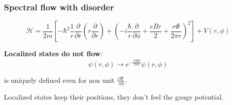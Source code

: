 \documentclass{beamer}
\begin{document}
\begin{frame}
\frametitle{Spectral flow with disorder}
\begin{center}
\[
\mathcal{H} = \frac{1}{2 m} \left[ -\hbar^2 \frac{1}{r} \frac{\partial}{\partial r} \left( r \frac{\partial}{\partial r} \right)  + \left( -i \frac{\hbar}{r} \frac{\partial }{\partial \phi} + \frac{e B r}{2} + \frac{e \Phi }{2 \pi r} \right)^2 \right] + V(r, \phi)
\]


\textbf{Localized states do not flow}: 
\[
\psi (r, \phi) \rightarrow e^{-\frac{i e \Phi \phi}{2 \pi \hbar}} \psi \left( r, \phi \right)\]

is uniquely defined even for non unit $\frac{e \Phi}{\ \pi \hbar}$.

Localized states keep their positions, they don't feel the gauge potential.





\end{center}
\end{frame}
\end{document}
